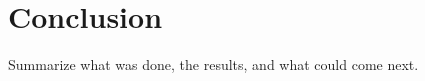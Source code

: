 \chapter{Conclusion}
\label{chap:conclusion}

Summarize what was done, the results, and what could come next.
